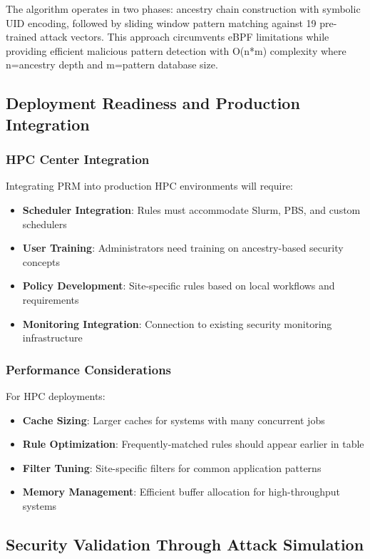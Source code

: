 \documentclass[conference]{IEEEtran}
\begin{document}
The algorithm operates in two phases: ancestry chain construction with symbolic UID encoding, followed by sliding window pattern matching against 19 pre-trained attack vectors. This approach circumvents eBPF limitations while providing efficient malicious pattern detection with O(n*m) complexity where n=ancestry depth and m=pattern database size.

\subsection{Deployment Readiness and Production Integration}

\subsubsection{HPC Center Integration}
Integrating PRM into production HPC environments will require:
\begin{itemize}
\item \textbf{Scheduler Integration}: Rules must accommodate Slurm, PBS, and custom schedulers
\item \textbf{User Training}: Administrators need training on ancestry-based security concepts
\item \textbf{Policy Development}: Site-specific rules based on local workflows and requirements
\item \textbf{Monitoring Integration}: Connection to existing security monitoring infrastructure
\end{itemize}

\subsubsection{Performance Considerations}
For HPC deployments:
\begin{itemize}
\item \textbf{Cache Sizing}: Larger caches for systems with many concurrent jobs
\item \textbf{Rule Optimization}: Frequently-matched rules should appear earlier in table
\item \textbf{Filter Tuning}: Site-specific filters for common application patterns
\item \textbf{Memory Management}: Efficient buffer allocation for high-throughput systems
\end{itemize}

\subsection{Security Validation Through Attack Simulation}
\label{sec:security_validation}
\end{document}
